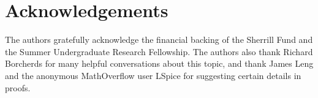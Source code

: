 \documentclass[12pt]{article}
\theoremstyle{definition}
\begin{document}
    

\section*{Acknowledgements}
The authors gratefully acknowledge the financial backing of the Sherrill Fund and the Summer Undergraduate Research Fellowship. The authors also thank Richard Borcherds for many helpful conversations about this topic, and thank James Leng and the anonymous MathOverflow user LSpice for suggesting certain details in proofs.


{}

\end{document}
